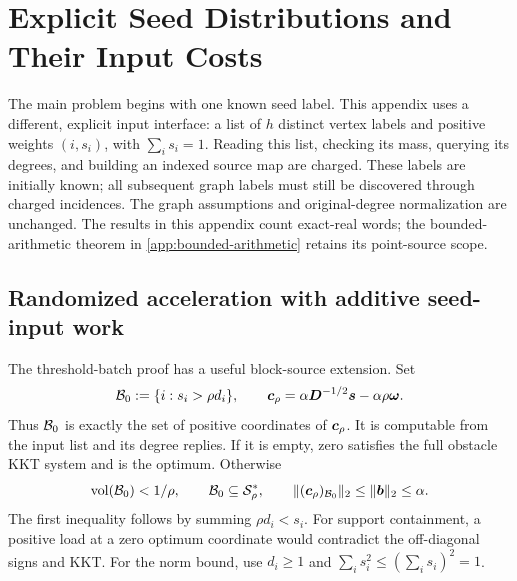 \section{Explicit Seed Distributions and Their Input Costs}
\label{app:seed-scope}

The main problem begins with one known seed label. This appendix uses a
different, explicit input interface: a list of $h$ distinct vertex labels
and positive weights $(i,s_i)$, with $\sum_i s_i=1$. Reading this list,
checking its mass, querying its degrees, and building an indexed source map
are charged. These labels are initially known; all subsequent graph labels
must still be discovered through charged incidences. The graph assumptions
and original-degree normalization are unchanged. The results in this
appendix count exact-real words; the bounded-arithmetic theorem in
\cref{app:bounded-arithmetic} retains its point-source scope.

\subsection{Randomized acceleration with additive seed-input work}

The threshold-batch proof has a useful block-source extension. Set
\begin{equation}
 \mathcal{B}_0:=\{i:s_i>\rho d_i\},\qquad
 \bm{c}_\rho=\alpha\bm{D}^{-1/2}\bm{s}-\alpha\rho\bm{\omega}.
 \label{eq:general-seed-initial-block}
\end{equation}
Thus $\mathcal{B}_0$ is exactly the set of positive coordinates of $\bm{c}_\rho$.
It is computable from the input list and its degree replies. If it is
empty, zero satisfies the full obstacle KKT system and is the optimum.
Otherwise
\begin{equation}
 \operatorname{vol}(\mathcal{B}_0)<1/\rho,\qquad
 \mathcal{B}_0\subseteq\mathcal S_\rho^*,\qquad
 \lVert(\bm{c}_\rho)_{\mathcal{B}_0}\rVert_2\leq\lVert\bm{b}\rVert_2\leq\alpha.
 \label{eq:general-seed-initial-bounds}
\end{equation}
The first inequality follows by summing $\rho d_i<s_i$.
For support containment, a positive load at a zero optimum coordinate
would contradict the off-diagonal signs and KKT. For the norm bound, use
$d_i\geq1$ and $\sum_i s_i^2\leq(\sum_i s_i)^2=1$.

